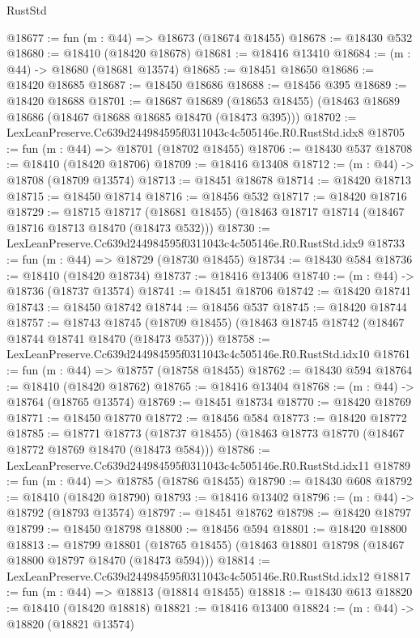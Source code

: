 \begin{lexlean}{RustStd}
\begin{coremodule}
@18677 := fun (m : @44) => @18673 (@18674 @18455)
@18678 := @18430 @532
@18680 := @18410 (@18420 @18678)
@18681 := @18416 @13410
@18684 := (m : @44) -> @18680 (@18681 @13574)
@18685 := @18451 @18650
@18686 := @18420 @18685
@18687 := @18450 @18686
@18688 := @18456 @395
@18689 := @18420 @18688
@18701 := @18687
    @18689
    (@18653 @18455)
    (@18463 @18689 @18686 (@18467 @18688 @18685 @18470 (@18473 @395)))
@18702 := LexLeanPreserve.Cc639d244984595f0311043c4c505146e.R0.RustStd.idx8
@18705 := fun (m : @44) => @18701 (@18702 @18455)
@18706 := @18430 @537
@18708 := @18410 (@18420 @18706)
@18709 := @18416 @13408
@18712 := (m : @44) -> @18708 (@18709 @13574)
@18713 := @18451 @18678
@18714 := @18420 @18713
@18715 := @18450 @18714
@18716 := @18456 @532
@18717 := @18420 @18716
@18729 := @18715
    @18717
    (@18681 @18455)
    (@18463 @18717 @18714 (@18467 @18716 @18713 @18470 (@18473 @532)))
@18730 := LexLeanPreserve.Cc639d244984595f0311043c4c505146e.R0.RustStd.idx9
@18733 := fun (m : @44) => @18729 (@18730 @18455)
@18734 := @18430 @584
@18736 := @18410 (@18420 @18734)
@18737 := @18416 @13406
@18740 := (m : @44) -> @18736 (@18737 @13574)
@18741 := @18451 @18706
@18742 := @18420 @18741
@18743 := @18450 @18742
@18744 := @18456 @537
@18745 := @18420 @18744
@18757 := @18743
    @18745
    (@18709 @18455)
    (@18463 @18745 @18742 (@18467 @18744 @18741 @18470 (@18473 @537)))
@18758 := LexLeanPreserve.Cc639d244984595f0311043c4c505146e.R0.RustStd.idx10
@18761 := fun (m : @44) => @18757 (@18758 @18455)
@18762 := @18430 @594
@18764 := @18410 (@18420 @18762)
@18765 := @18416 @13404
@18768 := (m : @44) -> @18764 (@18765 @13574)
@18769 := @18451 @18734
@18770 := @18420 @18769
@18771 := @18450 @18770
@18772 := @18456 @584
@18773 := @18420 @18772
@18785 := @18771
    @18773
    (@18737 @18455)
    (@18463 @18773 @18770 (@18467 @18772 @18769 @18470 (@18473 @584)))
@18786 := LexLeanPreserve.Cc639d244984595f0311043c4c505146e.R0.RustStd.idx11
@18789 := fun (m : @44) => @18785 (@18786 @18455)
@18790 := @18430 @608
@18792 := @18410 (@18420 @18790)
@18793 := @18416 @13402
@18796 := (m : @44) -> @18792 (@18793 @13574)
@18797 := @18451 @18762
@18798 := @18420 @18797
@18799 := @18450 @18798
@18800 := @18456 @594
@18801 := @18420 @18800
@18813 := @18799
    @18801
    (@18765 @18455)
    (@18463 @18801 @18798 (@18467 @18800 @18797 @18470 (@18473 @594)))
@18814 := LexLeanPreserve.Cc639d244984595f0311043c4c505146e.R0.RustStd.idx12
@18817 := fun (m : @44) => @18813 (@18814 @18455)
@18818 := @18430 @613
@18820 := @18410 (@18420 @18818)
@18821 := @18416 @13400
@18824 := (m : @44) -> @18820 (@18821 @13574)

\end{coremodule}
\end{lexlean}
